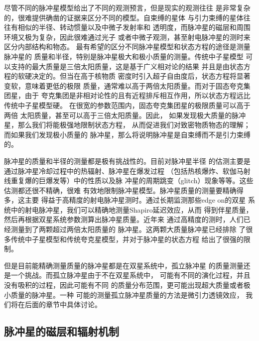 尽管不同的脉冲星模型给出了不同的观测预言，但是现实的观测往往
是非常复杂的，很难提供确凿的证据来区分不同的模型。自束缚的星体
与引力束缚的星体往往有相似的半径、转动惯量以及中微子发射率和
透明度，而脉冲星的磁层和周围环境又极为复杂，因此很难通过光子
或者中微子观测，甚至射电脉冲星的测时来区分内部结构和物态。
最有希望的区分不同脉冲星模型和状态方程的途径是测量脉冲星的
质量和半径，特别是脉冲星极大和极小质量的测量。传统中子星模型
可以支持的最大质量是三倍太阳质量，这是基于广义相对论的结果
并且是由状态方程的软硬决定的\supercite{rr74}。但当在高于核物质
密度时引入超子自由度后，状态方程将显著变软，意味着更低的极限
质量，通常难以高于两倍太阳质量。而对于固态夸克集团星，由于
夸克集团是非相对论性的且有近程排斥相互作用，所以状态方程远比
传统中子星模型硬。
在很宽的参数范围内，固态夸克集团星的极限质量可以高于两倍
太阳质量，甚至可以高于三倍太阳质量\supercite{lgx13}。因此，
如果发现极大质量的脉冲星，那么我们将能极强地限制状态方程，
从而促进我们对致密物质物态的理解；而如果我们发现极小质量的
脉冲星，那么将说明脉冲星是自束缚而不是引力束缚的。

脉冲星的质量和半径的测量都是极有挑战性的。目前对脉冲星半径
的估测主要是通过脉冲星冷却过程中的热辐射、脉冲星在爆发过程
（包括热核爆炸、软伽马射线重复爆的巨爆发等）中的性质以及脉
冲星的周期跳变（glitch）现象等等。这些估测都还很不精确，很难
有效地限制脉冲星模型。脉冲星质量的测量要精确得多，这主要
得益于高精度的射电脉冲星测时。通过长期监测那些edge on的双星
系统中的射电脉冲星，我们可以精确地测量Shapiro延迟效应，从而
得到伴星质量，然后再根据双星系统参数测算出脉冲星质量。近年来
通过高精度的测时，人们已经测量到了两颗超过两倍太阳质量的
脉冲星\supercite{Anton,Demorest}。这两颗大质量脉冲星已经排除
了很多传统中子星模型和传统夸克星模型，并对于脉冲星的状态方程
给出了很强的限制\supercite{Ozel2010,Lai2011}。

但是目前能精确测量质量的脉冲星都是在双星系统中，孤立脉冲星
的质量测量还是一个挑战。而孤立脉冲星由于不在双星系统中，
可能有不同的演化过程，并且没有吸积的过程，因此可能有不同
的质量分布范围，更可能出现超大质量或者极小质量的脉冲星。一种
可能的测量孤立脉冲星质量的方法是微引力透镜效应\supercite{Dai,dsl+15}，
我们将在后面的章节中具体讨论。

\subsection{脉冲星的磁层和辐射机制}

